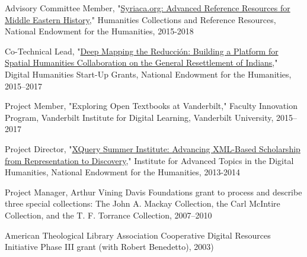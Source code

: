 \documentclass[10pt]{res} %
\begin{document}
\begin{resume}
\begin{hangparas}{.25in}{1}Advisory Committee Member, "\href{https://securegrants.neh.gov/PublicQuery/main.aspx?f=1\&gn=PW-228209-15}{Syriaca.org: Advanced Reference Resources for Middle Eastern History}," Humanities Collections and Reference Resources, National Endowment for the Humanities, 2015-2018\end{hangparas}  
\begin{hangparas}{.25in}{1}Co-Technical Lead, "\href{https://securegrants.neh.gov/PublicQuery/main.aspx?f=1\&gn=HD-229071-15}{Deep Mapping the Reducción: Building a Platform for Spatial Humanities Collaboration on the General Resettlement of Indians}," Digital Humanities Start-Up Grants, National Endowment for the Humanities, 2015–2017\end{hangparas} 

\begin{hangparas}{.25in}{1}Project Member, "Exploring Open Textbooks at Vanderbilt," Faculty Innovation Program, Vanderbilt Institute for Digital Learning, Vanderbilt University, 2015–2017\end{hangparas}

\begin{hangparas}{.25in}{1}Project Director, "\href{https://securegrants.neh.gov/publicquery/main.aspx?f=1\&gn=HT-50080-13}{XQuery Summer Institute: Advancing XML-Based Scholarship from Representation to Discovery}," Institute for Advanced Topics in the Digital Humanities, National Endowment for the Humanities, 2013-2014\end{hangparas}

\begin{hangparas}{.25in}{1}Project Manager, Arthur Vining Davis Foundations grant to process and describe three special collections: The John A. Mackay Collection, the Carl McIntire Collection, and the T. F. Torrance Collection, 2007–2010\end{hangparas}

\begin{hangparas}{.25in}{1}American Theological Library Association Cooperative Digital Resources Initiative Phase III grant (with Robert Benedetto), 2003)\end{hangparas}




\end{resume}
\end{document}
